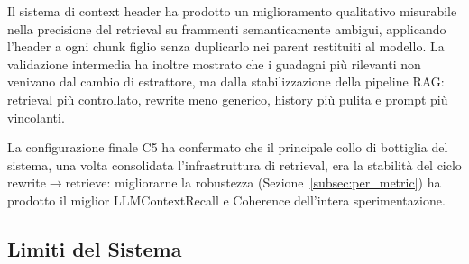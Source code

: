 \documentclass[11pt,a4paper]{article}
\begin{document}
Il sistema di context header ha prodotto un miglioramento qualitativo misurabile nella
precisione del retrieval su frammenti semanticamente ambigui, applicando l'header a ogni
chunk figlio senza duplicarlo nei parent restituiti al modello. La validazione intermedia
ha inoltre mostrato che i guadagni più rilevanti non venivano dal cambio di estrattore,
ma dalla stabilizzazione della pipeline RAG: retrieval più controllato, rewrite meno
generico, history più pulita e prompt più vincolanti.

La configurazione finale C5 ha confermato che il principale collo di bottiglia del
sistema, una volta consolidata l'infrastruttura di retrieval, era la stabilità del ciclo
rewrite$\to$retrieve: migliorarne la robustezza (Sezione~\ref{subsec:per_metric}) ha
prodotto il miglior LLMContextRecall e Coherence dell'intera sperimentazione.

\subsection{Limiti del Sistema}
\label{subsec:limiti_sistema}
\end{document}
